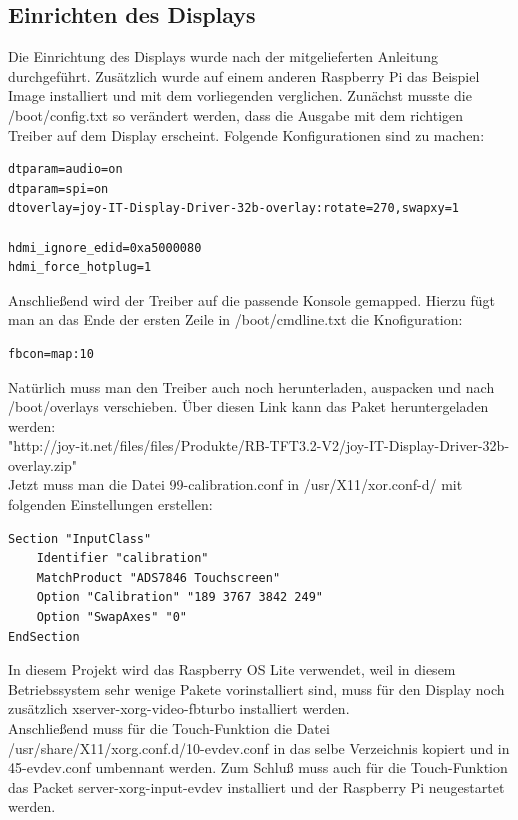 \documentclass[a4paper,11pt,singlespacing]{article}
\begin{document}
    \subsection{Einrichten des Displays}
    		Die Einrichtung des Displays wurde nach der mitgelieferten Anleitung durchgeführt. \cite{Quote_display_manual} Zusätzlich wurde auf einem anderen Raspberry Pi das Beispiel Image installiert und mit dem vorliegenden verglichen. Zunächst musste die /boot/config.txt so verändert werden, dass die Ausgabe mit dem richtigen Treiber auf dem Display erscheint. Folgende Konfigurationen sind zu machen:
    		\begin{lstlisting}
dtparam=audio=on
dtparam=spi=on
dtoverlay=joy-IT-Display-Driver-32b-overlay:rotate=270,swapxy=1

hdmi_ignore_edid=0xa5000080
hdmi_force_hotplug=1
    		\end{lstlisting}
    		
    		Anschließend wird der Treiber auf die passende Konsole gemapped. Hierzu fügt man an das Ende der ersten Zeile in /boot/cmdline.txt die Knofiguration:
    		\begin{lstlisting}
fbcon=map:10
    		\end{lstlisting}

			Natürlich muss man den Treiber auch noch herunterladen, auspacken und nach /boot/overlays verschieben. Über diesen Link kann das Paket heruntergeladen werden:\\
			
			"http://joy-it.net/files/files/Produkte/RB-TFT3.2-V2/joy-IT-Display-Driver-32b-overlay.zip" \\

    		Jetzt muss man die Datei 99-calibration.conf in /usr/X11/xor.conf-d/ mit folgenden Einstellungen erstellen:
    		\begin{lstlisting}
Section "InputClass"
	Identifier "calibration"
	MatchProduct "ADS7846 Touchscreen"
	Option "Calibration" "189 3767 3842 249"
	Option "SwapAxes" "0"
EndSection
    		\end{lstlisting}
 
			In diesem Projekt wird das Raspberry OS Lite verwendet, weil in diesem Betriebssystem sehr wenige Pakete vorinstalliert sind, muss für den Display noch zusätzlich xserver-xorg-video-fbturbo installiert werden. \\
			Anschließend muss für die Touch-Funktion die Datei /usr/share/X11/xorg.conf.d/10-evdev.conf in das selbe Verzeichnis kopiert und in 45-evdev.conf umbennant werden. Zum Schluß muss auch für die Touch-Funktion das Packet server-xorg-input-evdev installiert und der Raspberry Pi neugestartet werden.
\end{document}
